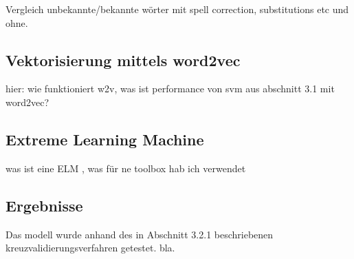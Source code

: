 Vergleich unbekannte/bekannte wörter mit spell correction, substitutions etc und ohne.

\subsection{Vektorisierung mittels word2vec}
hier: wie funktioniert w2v, was ist performance von svm aus abschnitt 3.1 mit word2vec?

\subsection{Extreme Learning Machine}
was ist eine ELM \citep{huangExtremeLearningMachine2006}, was für ne toolbox hab ich verwendet \citep{akusokHighPerformanceExtremeLearning2015}

\subsection{Ergebnisse}
Das modell wurde anhand des in Abschnitt 3.2.1 beschriebenen kreuzvalidierungsverfahren getestet. bla.